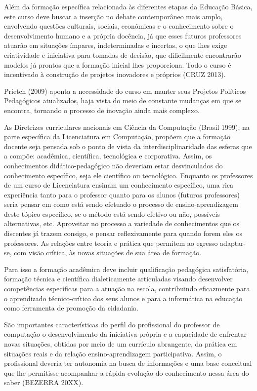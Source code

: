 Além da formação específica relacionada às diferentes etapas da Educação Básica, este curso deve buscar a inserção no debate contemporâneo mais amplo, envolvendo questões culturais, sociais, econômicas e o conhecimento sobre o desenvolvimento humano e a própria docência, já que esses futuros professores atuarão em situações ímpares, indeterminadas e incertas, o que lhes exige criatividade e iniciativa para tomadas de decisão, que dificilmente encontrarão modelos já prontos que a formação inicial lhes proporciona. Todo o curso é incentivado à construção de projetos inovadores e próprios (CRUZ 2013).


Prietch (2009) aponta a necessidade do curso em manter seus Projetos Políticos Pedagógicos atualizados, haja vista do meio de constante mudanças em que se encontra, tornando o processo de inovação ainda mais complexo. 


As Diretrizes curriculares nacionais em Ciência da Computação (Brasil 1999), na parte específica da Licenciatura em Computação, propõem que a formação docente seja pensada sob o ponto de vista da interdisciplinaridade das esferas que a compõe: acadêmica, científica, tecnológica e corporativa. Assim, os conhecimentos didático-pedagógico não deveriam estar desvinculados do conhecimento específico, seja ele científico ou tecnológico. Enquanto os professores de um curso de Licenciatura ensinam um conhecimento específico, uma rica experiência tanto para o professor quanto para os alunos (futuros professores) seria pensar em como está sendo efetuado o processo de ensino-aprendizagem deste tópico específico, se o método está sendo efetivo ou não, possíveis alternativas, etc. Aproveitar no processo a variedade de conhecimentos que os discentes já trazem consigo, e pensar reflexivamente para quando forem eles os professores. As relações entre teoria e prática que permitem ao egresso adaptar-se, com visão crítica, às novas situações de sua área de formação.


Para isso a formação acadêmica deve incluir qualificação pedagógica satisfatória, formação técnica e científica dialeticamente articuladas visando desenvolver competências específicas para a atuação na escola, contribuindo eficazmente para o aprendizado técnico-crítico dos seus alunos e para a informática na educação como ferramenta de promoção da cidadania.


São importantes características do perfil do profissional do professor de computação o desenvolvimento da iniciativa própria e a capacidade de enfrentar novas situações, obtidas por meio de um currículo abrangente, da prática em situações reais e da relação ensino-aprendizagem participativa. Assim, o profissional deveria ter autonomia na busca de informações e uma base conceitual que lhe permitisse acompanhar a rápida evolução do conhecimento nessa área do saber (BEZERRA 20XX).



